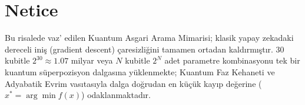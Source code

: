 \documentclass[11pt, a4paper]{article}
\begin{document}
\section{Netice}

Bu risalede vaz' edilen Kuantum Asgari Arama Mimarisi; klasik yapay zekadaki dereceli iniş (gradient descent) çaresizliğini tamamen ortadan kaldırmıştır. 30 kubitle $2^{30} \approx 1.07$ milyar veya $N$ kubitle $2^N$ adet parametre kombinasyonu tek bir kuantum süperpozisyon dalgasına yüklenmekte; Kuantum Faz Kehaneti ve Adyabatik Evrim vasıtasıyla dalga doğrudan en küçük kayıp değerine ($x^* = \arg\min f(x)$) odaklanmaktadır.
\end{document}

